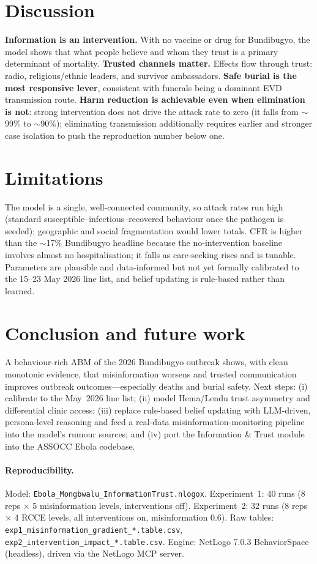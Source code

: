 \documentclass[11pt]{article}
\begin{document}
\section{Discussion}
\textbf{Information is an intervention.} With no vaccine or drug for Bundibugyo, the model shows that what people believe and whom they trust is a primary determinant of mortality. \textbf{Trusted channels matter.} Effects flow through trust: radio, religious/ethnic leaders, and survivor ambassadors. \textbf{Safe burial is the most responsive lever}, consistent with funerals being a dominant EVD transmission route. \textbf{Harm reduction is achievable even when elimination is not}: strong intervention does not drive the attack rate to zero (it falls from $\sim$99\% to $\sim$90\%); eliminating transmission additionally requires earlier and stronger case isolation to push the reproduction number below one.

\section{Limitations}
The model is a single, well-connected community, so attack rates run high (standard susceptible--infectious--recovered behaviour once the pathogen is seeded); geographic and social fragmentation would lower totals. CFR is higher than the $\sim$17\% Bundibugyo headline because the no-intervention baseline involves almost no hospitalisation; it falls as care-seeking rises and is tunable. Parameters are plausible and data-informed but not yet formally calibrated to the 15--23 May 2026 line list, and belief updating is rule-based rather than learned.

\section{Conclusion and future work}
A behaviour-rich ABM of the 2026 Bundibugyo outbreak shows, with clean monotonic evidence, that misinformation worsens and trusted communication improves outbreak outcomes---especially deaths and burial safety. Next steps: (i) calibrate to the May~2026 line list; (ii) model Hema/Lendu trust asymmetry and differential clinic access; (iii) replace rule-based belief updating with LLM-driven, persona-level reasoning and feed a real-data misinformation-monitoring pipeline into the model's rumour sources; and (iv) port the Information \& Trust module into the ASSOCC Ebola codebase.

\paragraph{Reproducibility.} Model: \texttt{Ebola\_Mongbwalu\_InformationTrust.nlogox}. Experiment~1: 40 runs (8 reps $\times$ 5 misinformation levels, interventions off). Experiment~2: 32 runs (8 reps $\times$ 4 RCCE levels, all interventions on, misinformation 0.6). Raw tables: \texttt{exp1\_misinformation\_gradient\_*.table.csv}, \texttt{exp2\_intervention\_impact\_*.table.csv}. Engine: NetLogo 7.0.3 BehaviorSpace (headless), driven via the NetLogo MCP server.
\end{document}
